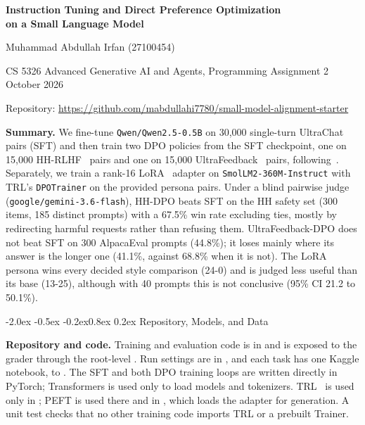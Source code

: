 \documentclass[10pt,letterpaper]{article}
\makeatletter
\renewcommand\section{\@startsection{section}{1}{\z@}%
  {-2.0ex \@plus -0.5ex \@minus -0.2ex}{0.8ex \@plus 0.2ex}%
  {\normalfont\large\bfseries\color{accent}}}
\newcommand{\code}[1]{\texttt{#1}}
\newcommand{\lead}[1]{\textbf{#1}\hspace{0.4em}}
\makeatother
\begin{document}
\thispagestyle{plain}
\begin{center}
{\LARGE\bfseries\color{accent} Instruction Tuning and Direct Preference Optimization\\[2pt] on a Small Language Model\par}
\vspace{6pt}
{\large Muhammad Abdullah Irfan \quad (27100454)\par}
\vspace{2pt}
{\small CS 5326 Advanced Generative AI and Agents, Programming Assignment 2 \quad\textperiodcentered{} October 2026\par}
\vspace{2pt}
{\small Repository: \url{https://github.com/mabdullahi7780/small-model-alignment-starter}\par}
\end{center}
\vspace{2pt}

\noindent\colorbox{rowgrey}{\parbox{\dimexpr\linewidth-2\fboxsep}{\small
\textbf{Summary.} We fine-tune \code{Qwen/Qwen2.5-0.5B} on 30,000 single-turn UltraChat~\cite{ding2023} pairs (SFT) and then train two DPO policies from the SFT checkpoint, one on 15,000 HH-RLHF~\cite{bai2022} pairs and one on 15,000 UltraFeedback~\cite{cui2023} pairs, following~\cite{ouyang2022}. Separately, we train a rank-16 LoRA~\cite{hu2022} adapter on \code{SmolLM2-360M-Instruct} with TRL's \code{DPOTrainer} on the provided persona pairs. Under a blind pairwise judge (\code{google/gemini-3.6-flash}), HH-DPO beats SFT on the HH safety set (300 items, 185 distinct prompts) with a 67.5\% win rate excluding ties, mostly by redirecting harmful requests rather than refusing them. UltraFeedback-DPO does not beat SFT on 300 AlpacaEval prompts (44.8\%); it loses mainly where its answer is the longer one (41.1\%, against 68.8\% when it is not). The LoRA persona wins every decided style comparison (24-0) and is judged less useful than its base (13-25), although with 40 prompts this is not conclusive (95\% CI 21.2 to 50.1\%).}}

\section{Repository, Models, and Data}

\lead{Repository and code.} Training and evaluation code is in  and is exposed to the grader through the root-level . Run settings are in , and each task has one Kaggle notebook,  to . The SFT and both DPO training loops are written directly in PyTorch; Transformers is used only to load models and tokenizers. TRL~\cite{hf} is used only in ; PEFT is used there and in , which loads the adapter for generation. A unit test checks that no other training code imports TRL or a prebuilt Trainer.
\end{document}
